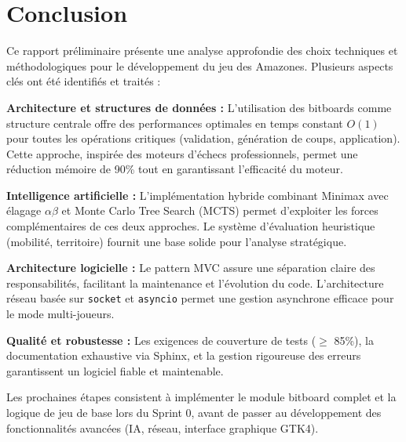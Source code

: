 \documentclass[a4paper]{article}
\begin{document}

\section*{Conclusion}

Ce rapport préliminaire présente une analyse approfondie des choix techniques et méthodologiques pour le développement du jeu des Amazones. Plusieurs aspects clés ont été identifiés et traités :

\textbf{Architecture et structures de données :} L'utilisation des bitboards comme structure centrale offre des performances optimales en temps constant $O(1)$ pour toutes les opérations critiques (validation, génération de coups, application). Cette approche, inspirée des moteurs d'échecs professionnels, permet une réduction mémoire de 90\% tout en garantissant l'efficacité du moteur.

\textbf{Intelligence artificielle :} L'implémentation hybride combinant Minimax avec élagage $\alpha\beta$ et Monte Carlo Tree Search (MCTS) permet d'exploiter les forces complémentaires de ces deux approches. Le système d'évaluation heuristique (mobilité, territoire) fournit une base solide pour l'analyse stratégique.

\textbf{Architecture logicielle :} Le pattern MVC assure une séparation claire des responsabilités, facilitant la maintenance et l'évolution du code. L'architecture réseau basée sur \texttt{socket} et \texttt{asyncio} permet une gestion asynchrone efficace pour le mode multi-joueurs.

\textbf{Qualité et robustesse :} Les exigences de couverture de tests ($\geq$ 85\%), la documentation exhaustive via Sphinx, et la gestion rigoureuse des erreurs garantissent un logiciel fiable et maintenable.

Les prochaines étapes consistent à implémenter le module bitboard complet et la logique de jeu de base lors du Sprint 0, avant de passer au développement des fonctionnalités avancées (IA, réseau, interface graphique GTK4).




\end{document}
